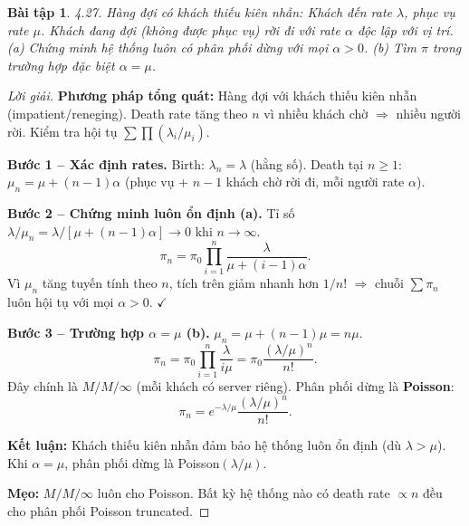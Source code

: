 \documentclass[8pt,a4paper]{article}
\newtheorem{exercise}{Bài tập}
\newenvironment{solution}{\begin{proof}[Lời giải]}{\end{proof}}
\begin{document}
\begin{exercise}
4.27. Hàng đợi có khách thiếu kiên nhẫn: Khách đến rate $\lambda$, phục vụ rate $\mu$. Khách đang đợi (không được phục vụ) rời đi với rate $\alpha$ độc lập với vị trí.
(a) Chứng minh hệ thống luôn có phân phối dừng với mọi $\alpha > 0$.
(b) Tìm $\pi$ trong trường hợp đặc biệt $\alpha = \mu$.
\end{exercise}
\begin{solution}
\textbf{Phương pháp tổng quát:} Hàng đợi với khách thiếu kiên nhẫn (impatient/reneging). Death rate tăng theo $n$ vì nhiều khách chờ $\Rightarrow$ nhiều người rời. Kiểm tra hội tụ $\sum \prod(\lambda_i/\mu_i)$.

\textbf{Bước 1 -- Xác định rates.} Birth: $\lambda_n = \lambda$ (hằng số). Death tại $n \ge 1$: $\mu_n = \mu + (n-1)\alpha$ (phục vụ + $n-1$ khách chờ rời đi, mỗi người rate $\alpha$).

\textbf{Bước 2 -- Chứng minh luôn ổn định (a).} Tỉ số $\lambda/\mu_n = \lambda/[\mu + (n-1)\alpha] \to 0$ khi $n \to \infty$.
\[
\pi_n = \pi_0 \prod_{i=1}^n \frac{\lambda}{\mu + (i-1)\alpha}.
\]
Vì $\mu_n$ tăng tuyến tính theo $n$, tích trên giảm nhanh hơn $1/n!$ $\Rightarrow$ chuỗi $\sum \pi_n$ luôn hội tụ với mọi $\alpha > 0$. $\checkmark$

\textbf{Bước 3 -- Trường hợp $\alpha = \mu$ (b).} $\mu_n = \mu + (n-1)\mu = n\mu$.
\[
\pi_n = \pi_0 \prod_{i=1}^n \frac{\lambda}{i\mu} = \pi_0 \frac{(\lambda/\mu)^n}{n!}.
\]
Đây chính là $M/M/\infty$ (mỗi khách có server riêng). Phân phối dừng là \textbf{Poisson}:
\[
\boxed{\pi_n = e^{-\lambda/\mu} \frac{(\lambda/\mu)^n}{n!}}.
\]

\textbf{Kết luận:} Khách thiếu kiên nhẫn đảm bảo hệ thống luôn ổn định (dù $\lambda > \mu$). Khi $\alpha = \mu$, phân phối dừng là Poisson$(\lambda/\mu)$.

\textbf{Mẹo:} $M/M/\infty$ luôn cho Poisson. Bất kỳ hệ thống nào có death rate $\propto n$ đều cho phân phối Poisson truncated.
\end{solution}
\end{document}
